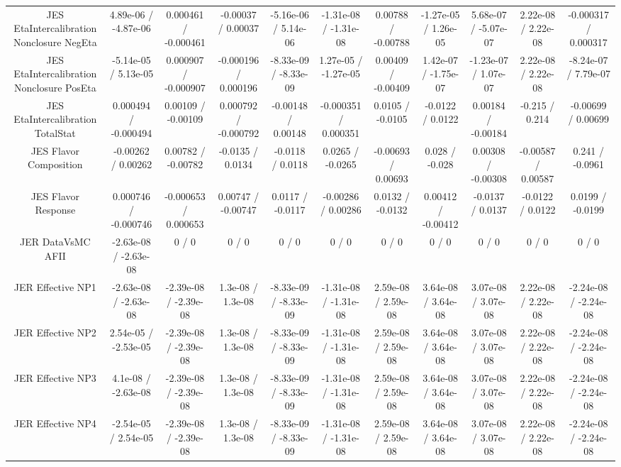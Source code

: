 \begin{table}[htbp]
\begin{center}
\begin{tabular}{|c|c|c|c|c|c|c|c|c|c|c|}
  JES EtaIntercalibration Nonclosure NegEta & 4.89e-06 / -4.87e-06 & 0.000461 / -0.000461 & -0.00037 / 0.00037 & -5.16e-06 / 5.14e-06 & -1.31e-08 / -1.31e-08 & 0.00788 / -0.00788 & -1.27e-05 / 1.26e-05 & 5.68e-07 / -5.07e-07 & 2.22e-08 / 2.22e-08 & -0.000317 / 0.000317 \\ 
  JES EtaIntercalibration Nonclosure PosEta & -5.14e-05 / 5.13e-05 & 0.000907 / -0.000907 & -0.000196 / 0.000196 & -8.33e-09 / -8.33e-09 & 1.27e-05 / -1.27e-05 & 0.00409 / -0.00409 & 1.42e-07 / -1.75e-07 & -1.23e-07 / 1.07e-07 & 2.22e-08 / 2.22e-08 & -8.24e-07 / 7.79e-07 \\ 
  JES EtaIntercalibration TotalStat & 0.000494 / -0.000494 & 0.00109 / -0.00109 & 0.000792 / -0.000792 & -0.00148 / 0.00148 & -0.000351 / 0.000351 & 0.0105 / -0.0105 & -0.0122 / 0.0122 & 0.00184 / -0.00184 & -0.215 / 0.214 & -0.00699 / 0.00699 \\ 
  JES Flavor Composition & -0.00262 / 0.00262 & 0.00782 / -0.00782 & -0.0135 / 0.0134 & -0.0118 / 0.0118 & 0.0265 / -0.0265 & -0.00693 / 0.00693 & 0.028 / -0.028 & 0.00308 / -0.00308 & -0.00587 / 0.00587 & 0.241 / -0.0961 \\ 
  JES Flavor Response & 0.000746 / -0.000746 & -0.000653 / 0.000653 & 0.00747 / -0.00747 & 0.0117 / -0.0117 & -0.00286 / 0.00286 & 0.0132 / -0.0132 & 0.00412 / -0.00412 & -0.0137 / 0.0137 & -0.0122 / 0.0122 & 0.0199 / -0.0199 \\ 
  JER DataVsMC AFII & -2.63e-08 / -2.63e-08 & 0 / 0 & 0 / 0 & 0 / 0 & 0 / 0 & 0 / 0 & 0 / 0 & 0 / 0 & 0 / 0 & 0 / 0 \\ 
  JER Effective NP1 & -2.63e-08 / -2.63e-08 & -2.39e-08 / -2.39e-08 & 1.3e-08 / 1.3e-08 & -8.33e-09 / -8.33e-09 & -1.31e-08 / -1.31e-08 & 2.59e-08 / 2.59e-08 & 3.64e-08 / 3.64e-08 & 3.07e-08 / 3.07e-08 & 2.22e-08 / 2.22e-08 & -2.24e-08 / -2.24e-08 \\ 
  JER Effective NP2 & 2.54e-05 / -2.53e-05 & -2.39e-08 / -2.39e-08 & 1.3e-08 / 1.3e-08 & -8.33e-09 / -8.33e-09 & -1.31e-08 / -1.31e-08 & 2.59e-08 / 2.59e-08 & 3.64e-08 / 3.64e-08 & 3.07e-08 / 3.07e-08 & 2.22e-08 / 2.22e-08 & -2.24e-08 / -2.24e-08 \\ 
  JER Effective NP3 & 4.1e-08 / -2.63e-08 & -2.39e-08 / -2.39e-08 & 1.3e-08 / 1.3e-08 & -8.33e-09 / -8.33e-09 & -1.31e-08 / -1.31e-08 & 2.59e-08 / 2.59e-08 & 3.64e-08 / 3.64e-08 & 3.07e-08 / 3.07e-08 & 2.22e-08 / 2.22e-08 & -2.24e-08 / -2.24e-08 \\ 
  JER Effective NP4 & -2.54e-05 / 2.54e-05 & -2.39e-08 / -2.39e-08 & 1.3e-08 / 1.3e-08 & -8.33e-09 / -8.33e-09 & -1.31e-08 / -1.31e-08 & 2.59e-08 / 2.59e-08 & 3.64e-08 / 3.64e-08 & 3.07e-08 / 3.07e-08 & 2.22e-08 / 2.22e-08 & -2.24e-08 / -2.24e-08 \\ 

\end{tabular}
\end{center}
\end{table}
